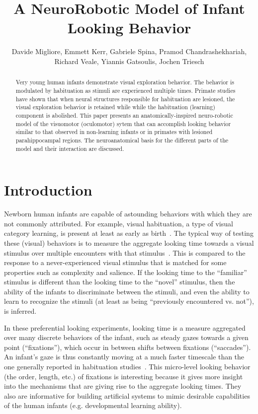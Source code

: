 \documentclass[conference]{IEEEtran}
\begin{document}
\title{A NeuroRobotic Model of Infant Looking Behavior}

\author{Davide Migliore, Emmett Kerr, Gabriele Spina, Pramod Chandrashekhariah,\\ Richard Veale, Yiannis Gatsoulis, Jochen Triesch}


\maketitle

\begin{abstract}
Very young human infants demonstrate visual exploration behavior. The
behavior is modulated by habituation as stimuli are experienced
multiple times. Primate studies have shown that when neural structures
responsible for habituation are lesioned, the visual exploration
behavior is retained while while the habituation (learning) component
is abolished. This paper presents an anatomically-inspired
neuro-robotic model of the visuomotor (oculomotor) sytem that can
accomplish looking behavior similar to that observed in non-learning
infants or in primates with lesioned parahippocampal regions. The
neuroanatomical basis for the different parts of the model and their
interaction are discussed.
\end{abstract}

\section{Introduction}
Newborn human infants are capable of astounding behaviors with which
they are not commonly attributed. For example, visual habituation, a
type of visual category learning, is present at least as early as
birth~\cite{slater_morison_rose_1984}. The typical way of testing
these (visual) behaviors is to measure the aggregate looking time
towards a visual stimulus over multiple encounters with that
stimulus~\cite{fantz_1964_seminal_habit}. This is compared to the
response to a never-experienced visual stimulus that is matched for
some properties such as complexity and salience. If the looking time
to the ``familiar'' stimulus is different than the looking time to the
``novel'' stimulus, then the ability of the infants to discriminate
between the stimuli, and even the ability to learn to recognize the
stimuli (at least as being ``previously encountered vs. not''), is
inferred.

In these preferential looking experiments, looking time is a measure
aggregated over many discrete behaviors of the infant, such as steady
gazes towards a given point (``fixations''), which occur in between
shifts between fixations (``saccades''). An infant's gaze is thus
constantly moving at a much faster timescale than the one generally
reported in habituation
studies~\cite{bronson_1990_infantscanning}. This micro-level looking
behavior (the order, length, etc.) of fixations is interesting because
it gives more insight into the mechanisms that are giving rise to the
aggregate looking times. They also are informative for building
artificial systems to mimic desirable capabilities of the human
infants (e.g. developmental learning ability).
\end{document}
